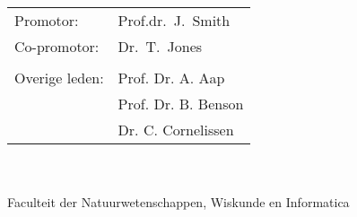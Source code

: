 {%
\clearpage
\noindent%
\begin{tabular}[t]{@{}ll}
Promotor:      & Prof.dr.\ J.~Smith\\                %
Co-promotor:   & Dr.\ T.~Jones\\                     %
\\
Overige leden: & Prof. Dr. A. Aap\\                  %
               & Prof. Dr. B. Benson\\               %
               & Dr. C. Cornelissen\\                %
\end{tabular}\\
\\
Faculteit der Natuurwetenschappen, Wiskunde en Informatica\\ %
\clearpage
} %

